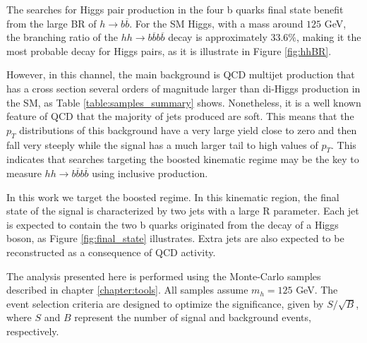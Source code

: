 %

The searches for Higgs pair production in the four b quarks final state benefit from the large BR of $h\rightarrow b\overline{b}$. For the SM Higgs, with a mass around $125$ GeV, the branching ratio of the $hh\rightarrow b\overline{b}b\overline{b}$ decay is approximately $33.6\%$, making it the most probable decay for Higgs pairs, as it is illustrate in Figure \ref{fig:hhBR}.


However, in this channel, the main background is QCD multijet production that has a cross section several orders of magnitude larger than di-Higgs production in the SM, as Table \ref{table:samples_summary} shows. Nonetheless, it is a well known feature of QCD that the majority of jets produced are soft. This means that the $p_T$ distributions of this background have a very large yield close to zero and then fall very steeply while the signal has a much larger tail to high values of $p_T$. This indicates that searches targeting the boosted kinematic regime may be the key to measure $hh\rightarrow b\overline{b}b\overline{b}$ using inclusive production.

In this work we target the boosted regime. In this kinematic region, the final state of the signal is characterized by two jets with a large R parameter. Each jet is expected to contain the two b quarks originated from the decay of a Higgs boson, as Figure \ref{fig:final_state} illustrates. Extra jets are also expected to be reconstructed as a consequence of QCD activity. 

The analysis presented here is performed using the Monte-Carlo samples described in chapter \ref{chapter:tools}. All samples assume $m_h=125$ GeV. The event selection criteria are designed to optimize the significance, given by $S/\sqrt{B}$, where $S$ and $B$ represent the number of signal and background events, respectively. 

